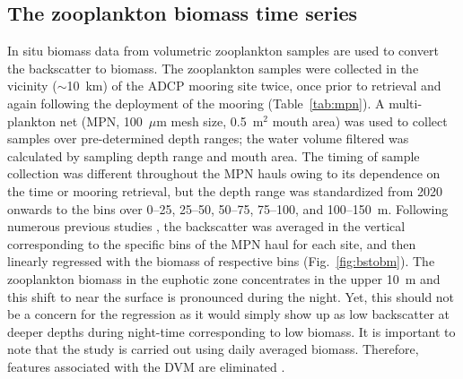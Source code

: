 \documentclass[authoryear,review,11pt]{elsarticle}
\begin{document}


\subsection{The zooplankton biomass time series}
\label{sec:data.biomass}

In situ biomass data from volumetric zooplankton samples are used to convert the backscatter to biomass.  The zooplankton  samples were collected in the vicinity ($\sim$10~km) of the ADCP mooring site twice, once prior to retrieval and again following the deployment of the mooring (Table~\ref{tab:mpn}). A multi-plankton net (MPN, 100~$\mu$m mesh size, 0.5~m$^2$ mouth area) was used to collect samples over pre-determined depth ranges; the water volume filtered was calculated by sampling depth range and mouth area.  The timing of sample collection was different throughout the MPN hauls owing to its dependence on the time or mooring retrieval, but the depth range was standardized from 2020 onwards to the bins over 0--25, 25--50, 50--75, 75--100, and 100--150~m. Following numerous previous studies \citep[A22;][]{flagg1989use, heywood1991estimation, jiang2007temporal}, the backscatter was averaged in the vertical corresponding to the specific bins of the MPN haul for each site, and then linearly regressed with the biomass of respective bins (Fig.~\ref{fig:bstobm}). The zooplankton biomass in the euphotic zone concentrates in the upper 10~m and this shift to near the surface is pronounced during the night. Yet, this should not be a concern for the regression as it would simply show up as low backscatter at deeper depths during night-time corresponding to low biomass. It is important to note that the study is carried out using daily averaged biomass. Therefore, features associated with the DVM are eliminated \citep[A22;][]{jiang2007temporal}.
\end{document}
